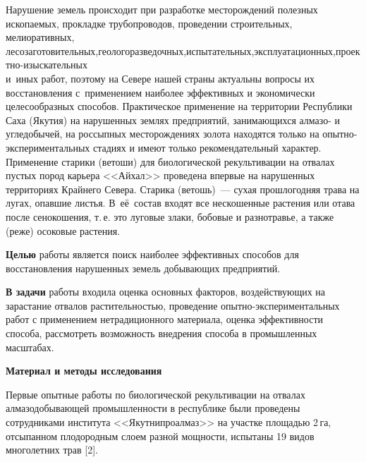 
 



\makeProcTitleNewLine

Нарушение земель происходит при разработке месторождений полезных ископаемых, прокладке трубопроводов, проведении строительных, мелиоративных, лесозаготовительных,\;\;геологоразведочных,\;\;испытательных,\;\;эксплуатационных,\;\;проектно-изыскательных\\и~иных работ, поэтому на Севере нашей страны актуальны вопросы их восстановления с~применением наиболее эффективных и экономически целесообразных способов. Практическое применение на территории Республики Саха (Якутия) на нарушенных землях предприятий, занимающихся алмазо- и угледобычей, на россыпных месторождениях золота находятся только на опытно-экспериментальных стадиях и имеют только рекомендательный характер.  Применение старики (ветоши) для биологической рекультивации на отвалах пустых пород карьера <<Айхал>> проведена впервые на нарушенных территориях Крайнего Севера. Старика (ветошь)~--- сухая прошлогодняя трава на лугах, опавшие листья. В~её~состав входят все нескошенные растения или отава после сенокошения, т.\,е. это луговые злаки, бобовые и разнотравье, а также (реже) осоковые растения.

\textbf{Целью} работы является поиск наиболее эффективных способов для восстановления нарушенных земель добывающих предприятий.

\textbf{В задачи} работы входила оценка основных факторов, воздействующих на зарастание отвалов растительностью, проведение опытно-экс\-пе\-ри\-мен\-таль\-ных работ с применением нетрадиционного материала, оценка эффективности способа, рассмотреть возможность внедрения способа в промышленных масштабах.

\textbf{Материал и методы исследования}

Первые опытные работы по биологической рекультивации на отвалах алмазодобывающей промышленности в республике были проведены сотрудниками института <<Якутнипроалмаз>> на участке площадью 2\,га, отсыпанном плодородным слоем разной мощности, испытаны 19 видов многолетних трав [2].

